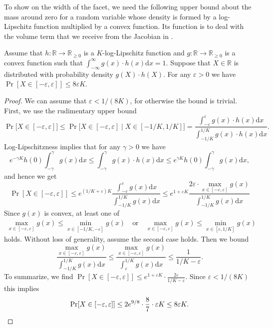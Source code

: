 \documentclass{theoretics}
\newcommand{\R}{\mathbb R}
\newcommand{\eps}{\varepsilon} %
\begin{document}
To show  on the width of the facet, we need the following upper bound about the mass around zero for a random variable whose density is formed by a log-Lipschitz function multiplied by a convex function.
Its function is to deal with the volume term that we receive from the Jacobian in .

\begin{lemma}\label{lem:integrals}
    Assume that $h : \R \to \R_{\geq 0}$ is a $K$-log-Lipschitz function
    and $g : \R \to \R_{\geq 0}$ is a convex function such that
    $\int_{-\infty}^\infty g(x) \cdot h(x) \mathrm d x = 1$.
    Suppose that $X \in \R$ is distributed with probability density $g(X)\cdot h(X)$.
    For any $\eps > 0$ we have
    $\Pr[X \in [-\eps, \eps]] \leq 8 \eps K$.
\end{lemma}
\begin{proof}
    We can assume that $\eps < 1/(8K)$, for otherwise the bound is trivial.
    First, we use the rudimentary upper bound
    \[
        \Pr\big[X \in [-\eps,\eps] \big]  \leq \Pr\big[X \in [-\eps, \eps] \mid X \in [-1/K,1/K] \big]
            = \frac
                {\int_{-\eps}^{\eps} g(x) \cdot h(x) \mathrm d x}
                {\int_{-1/K}^{1/K} g(x) \cdot h(x) \mathrm d x}.
    \]
    Log-Lipschitzness implies that for any $\gamma > 0$ we have
    \[
        e^{-\gamma K} h(0) \int_{-\gamma}^\gamma g(x) \mathrm d x
        \leq
        \int_{-\gamma}^\gamma g(x) \cdot h(x) \mathrm d x
        \leq
        e^{\gamma K} h(0) \int_{-\gamma}^\gamma g(x) \mathrm d x,
    \]
    and hence we get
    \[
        \Pr[X \in [-\eps, \eps]]
        \leq e^{(1/K + \eps) K} \frac
        {\int_{-\eps}^{\eps} g(x) \mathrm d x}
        {\int_{-1/K}^{1/K} g(x) \mathrm d x}
        \leq e^{1 + \eps K} \frac
        {2\eps \cdot \max_{x \in [-\eps, \eps]} g(x)}
        {\int_{-1/K}^{1/K} g(x) \mathrm d x}
    \]
    Since $g(x)$ is convex, at least one of
    \begin{align*}
        \max_{x \in [-\eps, \eps]} g(x) \leq \min_{x \in [-1/K, -\eps]} g(x)
        \quad \text{or} \quad
        \max_{x \in [-\eps, \eps]} g(x) \leq \min_{x \in [\eps, 1/K]} g(x)
    \end{align*}
    holds. Without loss of generality, assume the second case holds. Then we bound
    \[
        \frac
            {\max_{x \in [-\eps, \eps]} g(x)}
            {\int_{-1/K}^{1/K} g(x) \mathrm d x}
        \leq
        \frac
            {\max_{x \in [-\eps, \eps]} g(x)}
            {\int_{\eps}^{1/K} g(x) \mathrm d x}
        \leq \frac{1}{1/K - \eps}.
    \]
    To summarize, we find
        $\Pr[ X \in [-\eps, \eps]]
        \leq
        e^{1+\eps K} \cdot \frac{2\eps}{1/K - \eps}$.
    Since $\eps < 1/(8K)$ this implies
    \[
        \Pr[X \in [-\eps,\eps]] \leq 2 e^{9/8} \cdot \frac 8 7 \cdot \eps K \leq 8\eps K .\qedhere
    \]
\end{proof}
\end{document}
